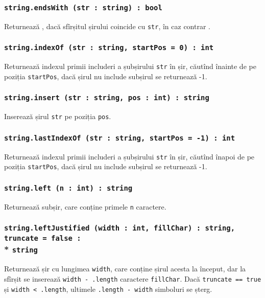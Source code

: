 \subsubsection{\texttt{string.endsWith (str : string) : bool}}

Returnează \true{}, dacă sfîrșitul șirului coincide cu \texttt{str}, în caz contrar \false{}.

\subsubsection{\texttt{string.indexOf (str : string, startPos = 0) : int}}

Returnează indexul primii includeri a șubșirului \texttt{str} în șir, căutînd înainte de pe poziția \texttt{startPos}, dacă șirul nu include subșirul se returnează -1.

\subsubsection{\texttt{string.insert (str : string, pos : int) : string}}

Inserează șirul \texttt{str} pe poziția \texttt{pos}.

\subsubsection{\texttt{string.lastIndexOf (str : string, startPos = -1) : int}}

Returnează indexul primii includeri a șubșirului \texttt{str} în șir, căutînd înapoi de pe poziția \texttt{startPos}, dacă șirul nu include subșirul se returnează -1.

\subsubsection{\texttt{string.left (n : int) : string}}

Returnează subșir, care conține primele \texttt{n} caractere.

\subsubsection{\texttt{string.leftJustified (width : int, fillChar) : string, truncate = false :}\\* \texttt{string}}

Returnează șir cu lungimea \texttt{width}, care conține șirul acesta la început, dar la sfîrșit se inserează \texttt{width - .length} caractere \texttt{fillChar}. Dacă \texttt{truncate == true} și \texttt{width < .length}, ultimele \texttt{.length - width} simboluri se șterg.

